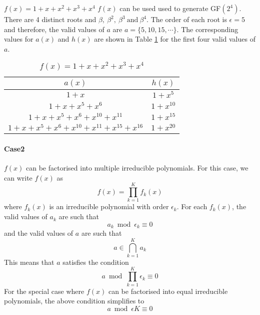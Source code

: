 \begin{example}
$f(x)=1+x+x^2+x^3+x^4$\newline
$f(x)$ can be used used to generate GF$(2^4)$. There are 4 distinct roots and $\beta,~\beta^2,~\beta^3~\text{and}~\beta^4$. The order of each root is $\epsilon=5$ and therefore, the valid values of $a$ are $a=\{5,10,15,\cdots\}$. The corresponding values for $a(x)$ and $h(x)$ are shown in Table \ref{novelTab3} for the first four valid values of $a$.

\begin{table}[htbp]
\caption{$f(x)=1+x+x^2+x^3+x^4$}
\centering
\begin{tabular}{c c} 
 \hline
 $a(x)$ & $h(x)$  \\ [0.5ex] 
 \hline\hline
$1+x$ &$1+x^5$\\ 
$1+x+x^5+x^6$ &$1+x^{10}$  \\
$1+x+x^5+x^6+x^{10}+x^{11}$ & $1+x^{15}$ \\
$1+x+x^5+x^6+x^{10}+x^{11}+x^{15}+x^{16}$ &$1+x^{20}$  
 \end{tabular}
 \label{novelTab3}
\end{table}
\end{example}


\paragraph{Case2}$f(x)$ can be factorised into multiple irreducible polynomials. \newline
For this case, we can write $f(x)$ as $$f(x)=\prod_{k=1}^{K}f_k(x)$$ where $f_k(x)$ is an irreducible polynomial with order $\epsilon_k$. 
For each $f_k(x)$, the valid values of  $a_k$ are such that 
$$a_k \bmod \epsilon_k \equiv 0$$ and the valid values of $a$ are such that
$$a \in  \bigcap_{k=1}^{K} a_k$$
This means that $a$ satisfies the condition
$$ a \bmod  \prod_{k=1}^{K} \epsilon_k \equiv 0$$
For the special case where $f(x)$ can be factorised into equal irreducible polynomials, the above condition simplifies to 
$$a \bmod \epsilon K \equiv 0$$

